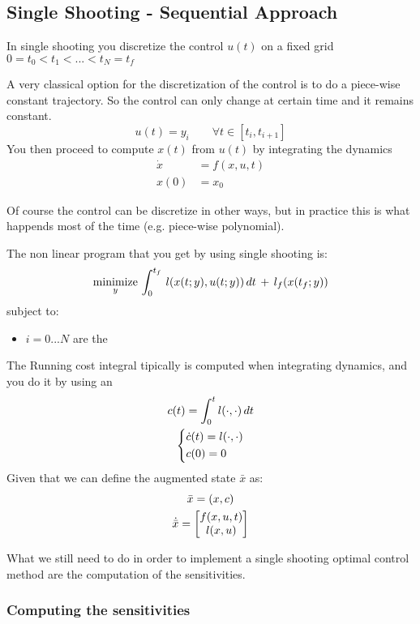 \subsection{Single Shooting - Sequential Approach}
In single shooting you discretize the control $u(t)$ on a fixed grid $0 = t_0 < t_1 < ... < t_N = t_f$


A very classical option for the discretization of the control is to do a piece-wise constant trajectory. So the control can only change at certain time and it remains constant.
\[u(t) = y_i \qquad\forall t\in[t_i, t_{i+1}]\]
You then proceed to compute $x(t)$ from $u(t)$ by integrating the dynamics
\begin{align*}
\dot{x} &= f(x,u,t)\\
x(0) &= x_0
\end{align*}

Of course the control can be discretize in other ways, but in practice this is what happends most of the time (e.g. piece-wise polynomial).

The non linear program that you get by using single shooting is:
\[\operatorname*{minimize}_{y}\,\int_{0}^{t_f} \,l(x(t; y), u(t; y))\,dt \,+\,l_f(x(t_f; y))\]
subject to:
\begin{itemize}
\item{ $i=0 ... N$} are the 
\end{itemize}

The Running cost integral tipically is computed when integrating dynamics, and you do it by using an 
\begin{gather*}
c(t) = \int_0^t l(\cdot, \cdot) \,dt\\
\begin{dcases}
\dot{c}(t) = l(\cdot, \cdot)\\
c(0) = 0
\end{dcases}
\end{gather*}
Given that we can define the augmented state $\bar{x}$ as:
\begin{gather*}
\bar{x} = (x,c)\\
\dot{\bar{x}} = \begin{bmatrix}f(x,u,t)\\l(x,u)\end{bmatrix}
\end{gather*}

What we still need to do in order to implement a single shooting optimal control method are the computation of the sensitivities.
\subsubsection{Computing the sensitivities}

